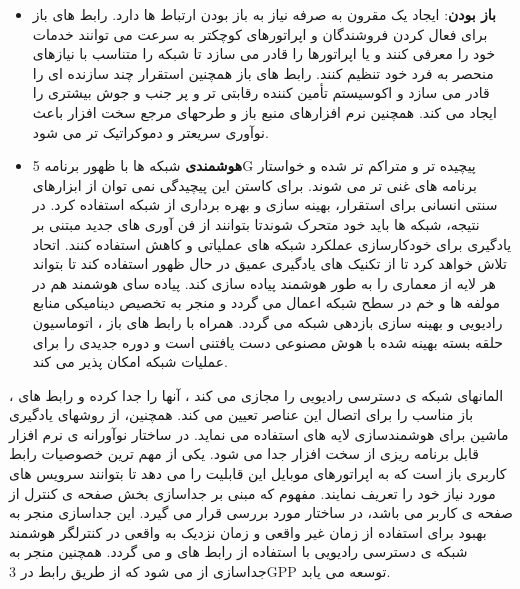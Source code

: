 \begin{itemize}
\item \textbf{باز بودن}:
ایجاد یک  مقرون به صرفه نیاز به باز بودن ارتباط ها دارد.
رابط های باز برای فعال کردن فروشندگان و اپراتورهای کوچکتر به سرعت می توانند خدمات خود را معرفی کنند و یا اپراتورها را قادر می سازد تا شبکه را متناسب با نیازهای منحصر به فرد خود تنظیم کنند.
رابط های باز همچنین استقرار چند سازنده ای را قادر می سازد و اکوسیستم تأمین کننده رقابتی تر و پر جنب و جوش بیشتری را ایجاد می کند.
 همچنین نرم افزارهای منبع باز و طرحهای مرجع سخت افزار باعث نوآوری سریعتر و دموکراتیک تر می شود.
 \item \textbf{هوشمندی}
 شبکه ها با ظهور برنامه 5G پیچیده تر و متراکم تر شده و خواستار برنامه های غنی تر می شوند.
 برای کاستن این پیچیدگی نمی توان از ابزارهای سنتی انسانی  برای استقرار، بهینه سازی و بهره برداری از شبکه استفاده کرد.
 در نتیجه، شبکه ها باید خود متحرک شوندتا بتوانند از فن آوری های جدید مبتنی بر یادگیری برای خودکارسازی عملکرد شبکه های عملیاتی و کاهش  استفاده کنند.
 اتحاد  تلاش خواهد کرد تا از تکنیک های یادگیری عمیق در حال ظهور استفاده کند تا بتواند هر لایه از معماری   را به طور هوشمند پیاده سازی کند.
 پیاده سای هوشمند هم در مولفه ها و خم در سطح شبکه اعمال می گردد و منجر به تخصیص دینامیکی منابع رادیویی و بهینه سازی بازدهی شبکه می گردد.
 همراه با رابط های باز ، اتوماسیون حلقه بسته بهینه شده با هوش مصنوعی دست یافتنی است و دوره جدیدی را برای عملیات شبکه امکان پذیر می کند.
\end{itemize}

، المانهای شبکه ی دسترسی رادیویی را مجازی می کند ، آنها را جدا کرده و رابط های باز مناسب را 
برای اتصال این عناصر
تعیین می کند. همچنین، 
از روشهای یادگیری ماشین برای هوشمندسازی لایه های 
 استفاده می نماید. 
 در ساختار نوآورانه ی 
 نرم افزار قابل برنامه ریزی 
 از سخت افزار جدا می شود.
  یکی از مهم ترین خصوصیات
  رابط کاربری باز است که به اپراتورهای موبایل این قابلیت را می دهد تا بتوانند سرویس های مورد نیاز خود را تعریف نمایند.
  مفهوم 
  که مبنی بر جداسازی 
   بخش صفحه ی کنترل  از
   صفحه ی کاربر 
می باشد، در ساختار 
مورد بررسی قرار می گیرد.
این جداسازی منجر به بهبود 
برای استفاده از زمان غیر واقعی و زمان نزدیک به واقعی در کنترلگر هوشمند شبکه ی دسترسی رادیویی   
با استفاده از رابط های 
و
 می گردد.
همچنین 
منجر به جداسازی 
 از 
 می شود
 که از طریق رابط  در 3GPP توسعه می یابد.

